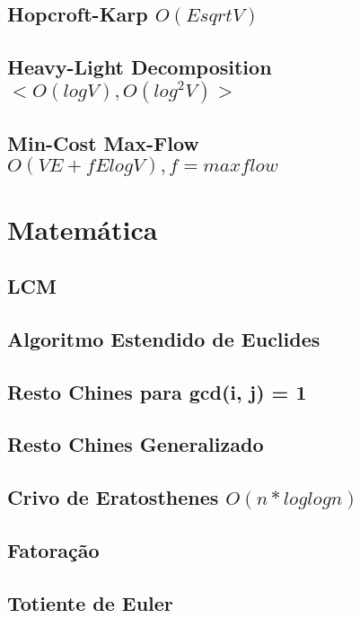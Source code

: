 \documentclass[10pt, letterpaper, twocolumn, twosides]{article}
\begin{document}
\subsection{Hopcroft-Karp ${O(E sqrt V)}$}

\subsection{Heavy-Light Decomposition ${<O(logV), O(log^2 V)>}$}

\subsection{Min-Cost Max-Flow ${O(VE + f E log V), f = maxflow}$}


\section{Matemática}
\subsection{LCM}

\subsection{Algoritmo Estendido de Euclides}

\subsection{Resto Chines para gcd(i, j) = 1}

\subsection{Resto Chines Generalizado}

\subsection{Crivo de Eratosthenes ${O(n*loglogn)}$}

\subsection{Fatoração}

\subsection{Totiente de Euler}

\end{document}
